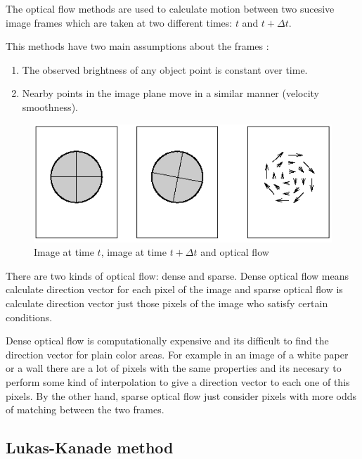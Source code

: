 The optical flow methods are used to calculate motion between two sucesive image frames which are taken
 at two different times: $t$ and $t + \Delta t$.

This methods have two main assumptions about the frames \cite{sonka2007}:

\begin{enumerate}
\item The observed brightness of any object point is constant over time.
\item Nearby points in the image plane move in a similar manner (velocity smoothness).
\end{enumerate}

\begin{figure}[h!]
\begin{center}
\includegraphics[scale=0.6]{images/oflow}
\caption{Image at time $t$, image at time $t + \Delta t$ and optical flow}
\label{fig:oflow}
\end{center}
\end{figure}

There are two kinds of optical flow: dense and sparse. Dense optical flow means  calculate direction vector for each pixel of the image and sparse optical flow is calculate direction vector just those pixels of the image 
who satisfy certain conditions.

Dense optical flow is computationally expensive and its difficult to find the direction vector 
for plain color areas. For example in an image of a white paper or a wall
there are a lot of pixels with the same properties and its necesary to perform some kind of interpolation to give a direction vector
 to each one of this pixels. 
By the other hand, sparse optical flow just consider pixels with more odds of matching between the two frames.

\subsection{Lukas-Kanade method}

